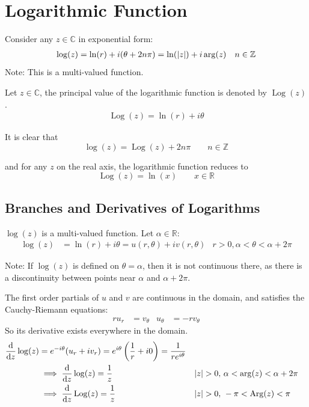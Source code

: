 \documentclass[12pt, english]{book}
\DeclareMathOperator\Log{Log}
\DeclareMathOperator\Arg{Arg}
\begin{document}
	\section{Logarithmic Function} \label{Logarithmic Function Section - Complex}
	
	\begin{definition}
		\label{Logarithmic Function Definition - Complex}
		Consider any \(z \in \mathbb{C}\) in exponential form:
		\begin{align*}
			\log(z) &= \ln(r) + i(\theta + 2n\pi) = \ln(\abs{z}) + i\arg(z) & n \in \mathbb{Z }
		\end{align*}
		Note: This is a multi-valued function.
	\end{definition}
	
	\begin{definition}
		\label{Principal Value of the Logarithmic Function Definition - Complex}
		Let \(z \in \mathbb{C}\), the principal value of the logarithmic function is denoted by \(\Log(z)\).
		\begin{align*}
			\Log(z) = \ln(r) + i\theta
		\end{align*}
	\end{definition}
	
	It is clear that 
	\[\log(z) = \Log(z) + 2n \pi \qquad n \in \mathbb{Z}\]
	
	and for any \(z\) on the real axis, the logarithmic function reduces to 
	\[\Log(z) = \ln(x) \qquad x \in \mathbb{R}\]
	
	\subsection{Branches and Derivatives of Logarithms} \label{Branches and Derivatives of Logarithms Subsection - Complex}
	
	\(\log(z)\) is a multi-valued function. Let \(\alpha \in \mathbb{R}\):
	\begin{align*}
		\log(z) &= \ln(r) + i \theta = u(r, \theta) + i v(r,\theta) &
			r>0, \alpha < \theta < \alpha + 2 \pi
	\end{align*}
	
	Note: If \(\log(z)\) is defined on \(\theta = \alpha\), then it is not continuous there, as there is a discontinuity between points near \(\alpha\) and \(\alpha + 2\pi\).
	
	The first order partials of \(u\) and \(v\) are continuous in the domain, and satisfies the Cauchy-Riemann equations:
	\begin{align*}
		ru_r &= v_\theta & u_\theta &= -rv_\theta
	\end{align*}
	So its derivative exists everywhere in the domain. 
	\begin{align*}
		\dv{z} \log(z) &= e^{-i\theta} (u_r + iv_r) = e^{i\theta} \left(\frac{1}{r} + i0\right) = \frac{1}{re^{i\theta}} \\
		&\implies \dv{z} \log(z) = \frac{1}{z} & \abs{z}>0,& \ \alpha < \arg(z) < \alpha + 2\pi\\
		&\implies \dv{z} \Log(z) = \frac{1}{z} & \abs{z}>0,& \ -\pi < \Arg(z) < \pi
	\end{align*}
\end{document}
